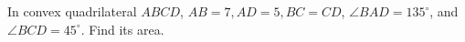 In convex quadrilateral $ABCD$, $AB=7,AD=5,BC=CD$, $\angle BAD=135^\circ$, and $\angle BCD=45^\circ$. Find its area.
